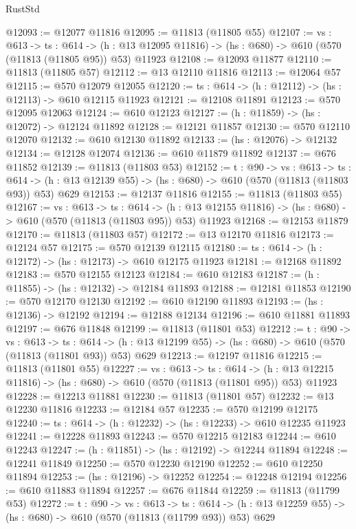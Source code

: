 \begin{lexlean}{RustStd}
\begin{coremodule}
@12093 := @12077 @11816
@12095 := @11813 (@11805 @55)
@12107 := {vs : @613} ->
  {ts : @614} ->
  (h : @13 @12095 @11816) -> (hs : @680) -> @610 (@570 (@11813 (@11805 @95)) @53) @11923
@12108 := @12093 @11877
@12110 := @11813 (@11805 @57)
@12112 := @13 @12110 @11816
@12113 := @12064 @57
@12115 := @570 @12079 @12055
@12120 := {ts : @614} -> (h : @12112) -> (hs : @12113) -> @610 @12115 @11923
@12121 := @12108 @11891
@12123 := @570 @12095 @12063
@12124 := @610 @12123
@12127 := (h : @11859) -> (hs : @12072) -> @12124 @11892
@12128 := @12121 @11857
@12130 := @570 @12110 @12070
@12132 := @610 @12130 @11892
@12133 := (hs : @12076) -> @12132
@12134 := @12128 @12074
@12136 := @610 @11879 @11892
@12137 := @676 @11852
@12139 := @11813 (@11803 @53)
@12152 := {t : @90} ->
  {vs : @613} ->
  {ts : @614} -> (h : @13 @12139 @55) -> (hs : @680) -> @610 (@570 (@11813 (@11803 @93)) @53) @629
@12153 := @12137 @11816
@12155 := @11813 (@11803 @55)
@12167 := {vs : @613} ->
  {ts : @614} ->
  (h : @13 @12155 @11816) -> (hs : @680) -> @610 (@570 (@11813 (@11803 @95)) @53) @11923
@12168 := @12153 @11879
@12170 := @11813 (@11803 @57)
@12172 := @13 @12170 @11816
@12173 := @12124 @57
@12175 := @570 @12139 @12115
@12180 := {ts : @614} -> (h : @12172) -> (hs : @12173) -> @610 @12175 @11923
@12181 := @12168 @11892
@12183 := @570 @12155 @12123
@12184 := @610 @12183
@12187 := (h : @11855) -> (hs : @12132) -> @12184 @11893
@12188 := @12181 @11853
@12190 := @570 @12170 @12130
@12192 := @610 @12190 @11893
@12193 := (hs : @12136) -> @12192
@12194 := @12188 @12134
@12196 := @610 @11881 @11893
@12197 := @676 @11848
@12199 := @11813 (@11801 @53)
@12212 := {t : @90} ->
  {vs : @613} ->
  {ts : @614} -> (h : @13 @12199 @55) -> (hs : @680) -> @610 (@570 (@11813 (@11801 @93)) @53) @629
@12213 := @12197 @11816
@12215 := @11813 (@11801 @55)
@12227 := {vs : @613} ->
  {ts : @614} ->
  (h : @13 @12215 @11816) -> (hs : @680) -> @610 (@570 (@11813 (@11801 @95)) @53) @11923
@12228 := @12213 @11881
@12230 := @11813 (@11801 @57)
@12232 := @13 @12230 @11816
@12233 := @12184 @57
@12235 := @570 @12199 @12175
@12240 := {ts : @614} -> (h : @12232) -> (hs : @12233) -> @610 @12235 @11923
@12241 := @12228 @11893
@12243 := @570 @12215 @12183
@12244 := @610 @12243
@12247 := (h : @11851) -> (hs : @12192) -> @12244 @11894
@12248 := @12241 @11849
@12250 := @570 @12230 @12190
@12252 := @610 @12250 @11894
@12253 := (hs : @12196) -> @12252
@12254 := @12248 @12194
@12256 := @610 @11883 @11894
@12257 := @676 @11844
@12259 := @11813 (@11799 @53)
@12272 := {t : @90} ->
  {vs : @613} ->
  {ts : @614} -> (h : @13 @12259 @55) -> (hs : @680) -> @610 (@570 (@11813 (@11799 @93)) @53) @629

\end{coremodule}
\end{lexlean}
